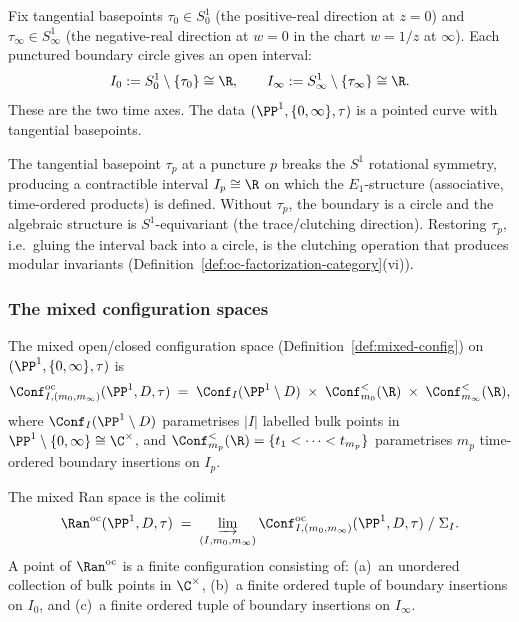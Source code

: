 Fix tangential basepoints $\tau_0 \in S^1_0$ (the positive-real
direction at $z = 0$) and $\tau_\infty \in S^1_\infty$ (the
negative-real direction at $w = 0$ in the chart $w = 1/z$ at
$\infty$). Each punctured boundary circle gives an open interval:
\begin{equation}\label{eq:benchmark-boundary-intervals}
 I_0 := S^1_0 \setminus \{\tau_0\} \cong \R,
 \qquad
 I_\infty := S^1_\infty \setminus \{\tau_\infty\} \cong \R.
\end{equation}
These are the two time axes. The data
$(\PP^1, \{0,\infty\}, \tau)$ is a pointed curve with tangential
basepoints.

\begin{remark}
\label{rem:benchmark-tangential-content}
The tangential basepoint $\tau_p$ at a puncture $p$ breaks the
$S^1$ rotational symmetry, producing a contractible interval
$I_p \cong \R$ on which the $E_1$-structure (associative,
time-ordered products) is defined. Without $\tau_p$, the boundary
is a circle and the algebraic structure is $S^1$-equivariant
(the trace/clutching direction). Restoring $\tau_p$, i.e.\
gluing the interval back into a circle, is the clutching
operation that produces modular invariants
(Definition~\ref{def:oc-factorization-category}(vi)).
\end{remark}


\subsubsection{The mixed configuration spaces}
\label{subsubsec:benchmark-mixed-config}

The mixed open/closed configuration space
(Definition~\ref{def:mixed-config}) on $(\PP^1, \{0,\infty\}, \tau)$
is
\begin{equation}\label{eq:benchmark-mixed-config}
 \Conf^{\mathrm{oc}}_{I,(m_0,m_\infty)}(\PP^1, D, \tau)
 \;=\;
 \Conf_I(\PP^1 \setminus D)
 \;\times\;
 \Conf^{<}_{m_0}(\R)
 \;\times\;
 \Conf^{<}_{m_\infty}(\R),
\end{equation}
where $\Conf_I(\PP^1 \setminus D)$ parametrises $|I|$ labelled
bulk points in $\PP^1 \setminus \{0,\infty\} \cong \C^\times$,
and $\Conf^{<}_{m_p}(\R) = \{t_1 < \cdots < t_{m_p}\}$
parametrises $m_p$ time-ordered boundary insertions on $I_p$.

The mixed Ran space is the colimit
\[
 \Ran^{\mathrm{oc}}(\PP^1, D, \tau)
 \;=\;
 \varinjlim_{(I,m_0,m_\infty)}
 \Conf^{\mathrm{oc}}_{I,(m_0,m_\infty)}(\PP^1, D, \tau)
 \;/\; \Sigma_I.
\]
A point of $\Ran^{\mathrm{oc}}$ is a finite configuration
consisting of: (a)~an unordered collection of bulk points in
$\C^\times$, (b)~a finite ordered tuple of boundary insertions
on $I_0$, and (c)~a finite ordered tuple of boundary insertions
on $I_\infty$.


